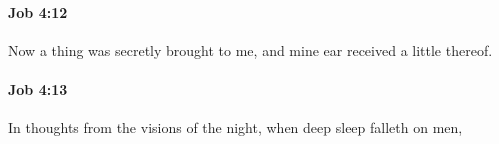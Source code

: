 		\paragraph{Job 4:12} %
			\label{JOB-4-12}

			Now a thing was secretly brought to me, and mine ear received a little thereof.


		\paragraph{Job 4:13} %
			\label{JOB-4-13}

			In thoughts from the visions of the night, when deep sleep falleth on men,


